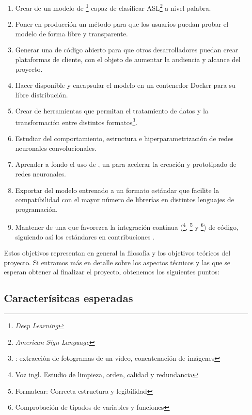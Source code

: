 \begin{enumerate}
  \item Crear de un modelo de \footnote{\textit{Deep Learning}} capaz de clasificar ASL\footnote{\textit{American Sign Language}} a nivel palabra.
  \item Poner en producción un método para que los usuarios puedan probar el modelo de forma libre y transparente.
  \item Generar una  de código abierto para que otros desarrolladores puedan crear plataformas de cliente, con el objeto de aumentar la audiencia y alcance del proyecto.
  \item Hacer disponible y encapsular el modelo en un contenedor Docker para su libre distribución.
  \item Crear de herramientas que permitan el tratamiento de datos y la transformación entre distintos formatos\footnote{\pe: extracción de fotogramas de un vídeo, concatenación de imágenes}.
  \item Estudiar del comportamiento, estructura e hiperparametrización de redes neuronales convolucionales.
  \item Aprender a fondo el uso de \cite{PYTORCH}, un  para acelerar la creación y prototipado de redes neuronales.
  \item Exportar del modelo entrenado a un formato estándar que facilite la compatibilidad con el mayor número de librerías en distintos lenguajes de programación.
  \item Mantener de una  que favorezca la integración continua (\footnote{Voz ingl. Estudio de limpieza, orden, calidad y redundancia}, \footnote{Formatear: Correcta estructura y legibilidad} y \footnote{Comprobación de tipados de variables y funciones}) de código, siguiendo así los estándares en contribuciones .
\end{enumerate}


Estos objetivos representan en general la filosofía y los objetivos teóricos del proyecto. Si entramos más en detalle sobre los aspectos técnicos y las  que se esperan obtener al finalizar el proyecto, obtenemos los siguientes puntos:

\subsection{Caracterísitcas esperadas}

